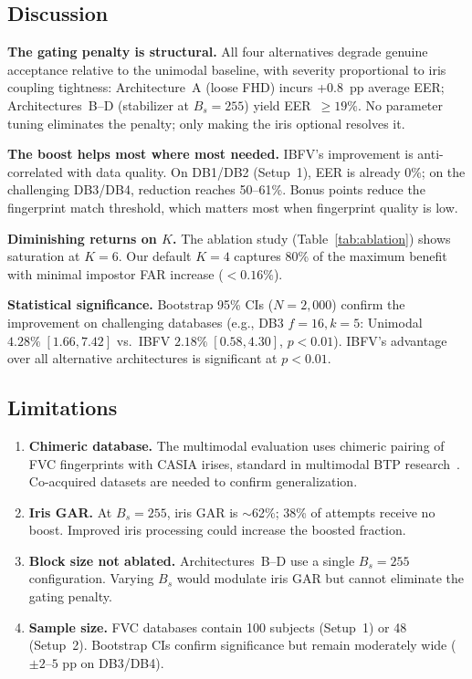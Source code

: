 \documentclass[3p,twocolumn]{elsarticle}
\newcommand{\IBFV}{\textsf{IBFV}}
\begin{document}
\subsection{Discussion}
\label{sec:discussion}

\textbf{The gating penalty is structural.} All four alternatives degrade genuine acceptance relative to the unimodal baseline, with severity proportional to iris coupling tightness: Architecture~A (loose FHD) incurs +0.8~pp average EER; Architectures~B--D (stabilizer at $B_s = 255$) yield EER~$\geq 19\%$. No parameter tuning eliminates the penalty; only making the iris optional resolves it.

\textbf{The boost helps most where most needed.} \IBFV{}'s improvement is anti-correlated with data quality. On DB1/DB2 (Setup~1), EER is already 0\%; on the challenging DB3/DB4, reduction reaches 50--61\%. Bonus points reduce the fingerprint match threshold, which matters most when fingerprint quality is low.

\textbf{Diminishing returns on $K$.} The ablation study (Table~\ref{tab:ablation}) shows saturation at $K = 6$. Our default $K = 4$ captures 80\% of the maximum benefit with minimal impostor FAR increase ($< 0.16\%$).

\textbf{Statistical significance.} Bootstrap 95\% CIs ($N = 2{,}000$) confirm the improvement on challenging databases (e.g., DB3 $f{=}16, k{=}5$: Unimodal $4.28\%\;[1.66, 7.42]$ vs.\ \IBFV{} $2.18\%\;[0.58, 4.30]$, $p < 0.01$). \IBFV{}'s advantage over all alternative architectures is significant at $p < 0.01$.

\subsection{Limitations}
\label{sec:limitations}

\begin{enumerate}
    \item \textbf{Chimeric database.} The multimodal evaluation uses chimeric pairing of FVC fingerprints with CASIA irises, standard in multimodal BTP research~\cite{ross2003information,nandakumar2008multibiometric}. Co-acquired datasets are needed to confirm generalization.
    \item \textbf{Iris GAR.} At $B_s = 255$, iris GAR is $\sim$62\%; 38\% of attempts receive no boost. Improved iris processing could increase the boosted fraction.
    \item \textbf{Block size not ablated.} Architectures~B--D use a single $B_s = 255$ configuration. Varying $B_s$ would modulate iris GAR but cannot eliminate the gating penalty.
    \item \textbf{Sample size.} FVC databases contain 100 subjects (Setup~1) or 48 (Setup~2). Bootstrap CIs confirm significance but remain moderately wide ($\pm 2$--$5$ pp on DB3/DB4).
\end{enumerate}
\end{document}
